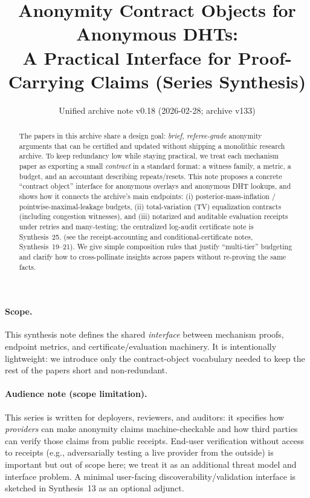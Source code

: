 \documentclass[11pt]{article}
\title{Anonymity Contract Objects for Anonymous DHTs:\\A Practical Interface for Proof-Carrying Claims (Series Synthesis)}
\author{}
\date{Unified archive note v0.18 (2026-02-28; archive v133)}
\begin{document}
\maketitle

\begin{abstract}
The papers in this archive share a design goal: \emph{brief, referee-grade} anonymity arguments that can be
certified and updated without shipping a monolithic research archive.
To keep redundancy low while staying practical, we treat each mechanism paper as exporting a small \emph{contract}
in a standard format: a witness family, a metric, a budget, and an accountant describing repeats/resets.
This note proposes a concrete ``contract object'' interface for anonymous overlays and anonymous DHT lookups, and
shows how it connects the archive's main endpoints: (i) posterior-mass-inflation / pointwise-maximal-leakage budgets,
(ii) total-variation (TV) equalization contracts (including congestion witnesses), and (iii) notarized and auditable
evaluation receipts under retries and many-testing; the centralized log-audit certificate note is Synthesis~25.\cite{series:stataudit} (see the receipt-accounting and conditional-certificate notes, Synthesis~19--21).\cite{series:accountingrulebook,series:auditorreplay,series:condcert}
We give simple composition rules that justify ``multi-tier'' budgeting and clarify how to cross-pollinate insights
across papers without re-proving the same facts.
\end{abstract}
\paragraph{Scope.}
This synthesis note defines the shared \emph{interface} between mechanism proofs, endpoint metrics, and certificate/evaluation machinery.
It is intentionally lightweight: we introduce only the contract-object vocabulary needed to keep the rest of the papers short and non-redundant.

\paragraph{Audience note (scope limitation).} This series is written for deployers, reviewers, and auditors: it specifies how \emph{providers} can make anonymity claims machine-checkable and how third parties can verify those claims from public receipts. End-user verification without access to receipts (e.g., adversarially testing a live provider from the outside) is important but out of scope here; we treat it as an additional threat model and interface problem. A minimal user-facing discoverability/validation interface is sketched in Synthesis~13 as an optional adjunct.\cite{series:userverif}
\end{document}
